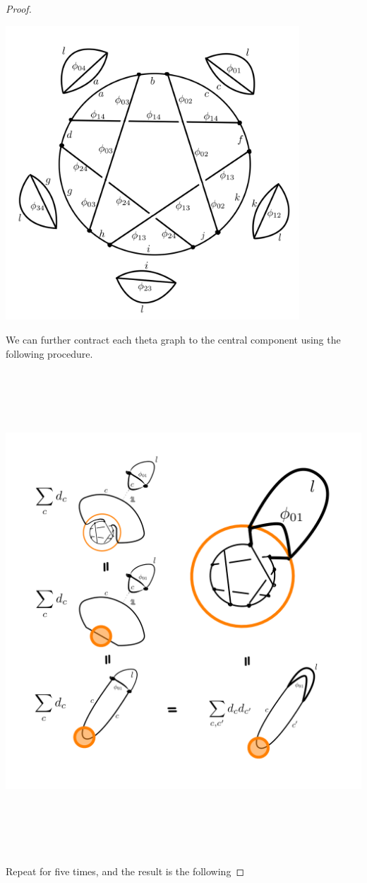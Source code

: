 \documentclass[12pt]{extarticle}
\numberwithin{equation}{section} %
\theoremstyle{mystyle}
\begin{document}
\begin{proof}
  \begin{center}
    \includegraphics[height=11cm]{main-shadow-state-sum-2}
  \end{center}

  \noindent %
  We can further contract each theta graph to the central
  component using the following procedure.

  \begin{center}
    \includegraphics[height=18cm]{main-workaround}
  \end{center}
  \noindent Repeat for five times, and the result is the
  following


\end{proof}
\end{document}
